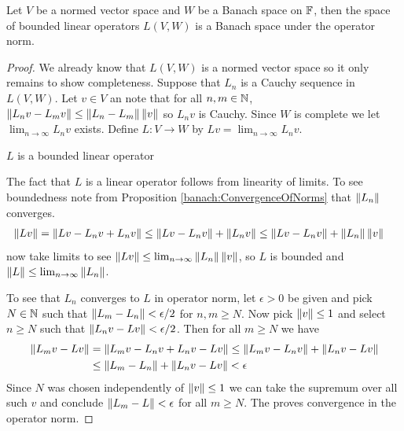 \begin{prop}\label{banach:BoundedLinearMapsBanach}Let $V$ be a normed vector space and $W$ be a Banach space
  on $\mathbb{F}$, then
 the space of bounded linear operators $L(V,W)$ is a Banach space under
  the operator norm.  
\end{prop}
\begin{proof}
  We already know that $L(V,W)$ is a normed vector space so it only
  remains to show completeness.   Suppose that $L_n$ is a Cauchy
  sequence in $L(V,W)$.   Let $v \in V$ an note that for all $n,m \in
  \mathbb{N}$, $\left \lVert L_nv - L_m v \right \rVert \leq \left \lVert L_n - L_m  \right \rVert \left \lVert v \right \rVert$ so
  $L_n v$ is Cauchy.   Since $W$ is complete we let $\lim_{n \to
    \infty} L_n v$ exists.   Define $L : V \to W$ by $L v = \lim_{n \to
      \infty} L_n v$.

    \begin{clm} $L$ is a bounded linear operator
    \end{clm}

    The fact that $L$ is a linear operator follows from linearity of
    limits.  To see boundedness note from Proposition
    \ref{banach:ConvergenceOfNorms} that $\left \lVert L_n \right \rVert$ converges.
    \begin{align*}
      \left \lVert L v \right \rVert &= \left \lVert Lv - L_n v + L_n v \right \rVert \leq \left \lVert Lv - L_n v \right \rVert +
                   \left \lVert L_nv \right \rVert \leq \left \lVert Lv - L_n v \right \rVert + \left \lVert L_n \right \rVert\left \lVert v \right \rVert
    \end{align*}
    now take limits to see $\left \lVert Lv \right \rVert \leq \lim_{n\to \infty}
    \left \lVert L_n \right \rVert\left \lVert v \right \rVert$, so $L$ is bounded and $\left \lVert L \right \rVert \leq \lim_{n\to \infty} \left \lVert L_n \right \rVert$.

    To see that $L_n$ converges to $L$ in operator norm, let $\epsilon
    > 0$ be given and pick $N \in \mathbb{N}$ such that $\left \lVert L_m -
      L_n \right \rVert < \epsilon/2$ for $n, m \geq N$.  Now pick $\left \lVert v \right \rVert \leq
    1$ and select $n \geq N$ such that $\left \lVert L_n v - Lv \right \rVert <
    \epsilon/2$.  Then for all $m \geq N$ we have
    \begin{align*}
      \left \lVert L_m v - L v \right \rVert &= \left \lVert L_m v - L_nv + L_nv - L v \right \rVert
                           \leq \left \lVert L_m v - L_nv \right \rVert + \left \lVert L_nv - Lv \right \rVert \\
                          &\leq  \left \lVert L_m - L_n \right \rVert + \left \lVert L_nv - L v \right \rVert < \epsilon
    \end{align*}
    Since $N$ was chosen independently of $\left \lVert v \right \rVert \leq 1$ we can take
    the supremum over all such $v$ and conclude
    $\left \lVert L_m - L \right \rVert < \epsilon$ for all $m \geq N$.   The proves
    convergence in the operator norm.
\end{proof}

